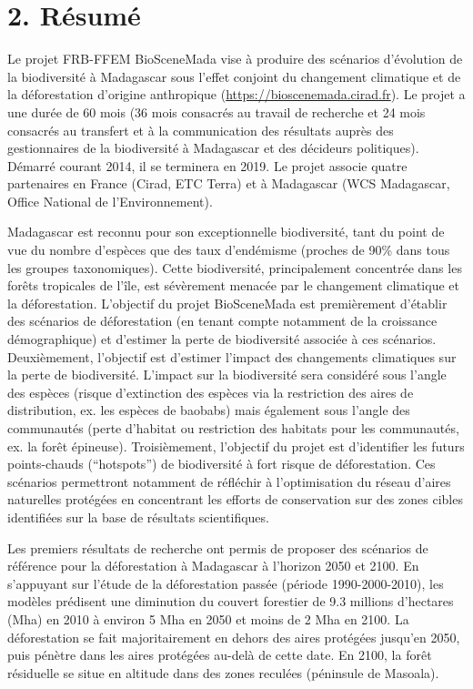 \documentclass[12pt,]{article}
\begin{document}
\hypertarget{resume}{%
\section{2. Résumé}\label{resume}}

Le projet FRB-FFEM BioSceneMada vise à produire des scénarios
d'évolution de la biodiversité à Madagascar sous l'effet conjoint du
changement climatique et de la déforestation d'origine anthropique
(\url{https://bioscenemada.cirad.fr}). Le projet a une durée de 60 mois
(36 mois consacrés au travail de recherche et 24 mois consacrés au
transfert et à la communication des résultats auprès des gestionnaires
de la biodiversité à Madagascar et des décideurs politiques). Démarré
courant 2014, il se terminera en 2019. Le projet associe quatre
partenaires en France (Cirad, ETC Terra) et à Madagascar (WCS
Madagascar, Office National de l'Environnement).

Madagascar est reconnu pour son exceptionnelle biodiversité, tant du
point de vue du nombre d'espèces que des taux d'endémisme (proches de
90\% dans tous les groupes taxonomiques). Cette biodiversité,
principalement concentrée dans les forêts tropicales de l'île, est
sévèrement menacée par le changement climatique et la déforestation.
L'objectif du projet BioSceneMada est premièrement d'établir des
scénarios de déforestation (en tenant compte notamment de la croissance
démographique) et d'estimer la perte de biodiversité associée à ces
scénarios. Deuxièmement, l'objectif est d'estimer l'impact des
changements climatiques sur la perte de biodiversité. L'impact sur la
biodiversité sera considéré sous l'angle des espèces (risque
d'extinction des espèces via la restriction des aires de distribution,
ex. les espèces de baobabs) mais également sous l'angle des communautés
(perte d'habitat ou restriction des habitats pour les communautés, ex.
la forêt épineuse). Troisièmement, l'objectif du projet est d'identifier
les futurs points-chauds (``hotspots'') de biodiversité à fort risque de
déforestation. Ces scénarios permettront notamment de réfléchir à
l'optimisation du réseau d'aires naturelles protégées en concentrant les
efforts de conservation sur des zones cibles identifiées sur la base de
résultats scientifiques.

Les premiers résultats de recherche ont permis de proposer des scénarios
de référence pour la déforestation à Madagascar à l'horizon 2050 et
2100. En s'appuyant sur l'étude de la déforestation passée (période
1990-2000-2010), les modèles prédisent une diminution du couvert
forestier de 9.3 millions d'hectares (Mha) en 2010 à environ 5 Mha en
2050 et moins de 2 Mha en 2100. La déforestation se fait majoritairement
en dehors des aires protégées jusqu'en 2050, puis pénètre dans les aires
protégées au-delà de cette date. En 2100, la forêt résiduelle se situe
en altitude dans des zones reculées (péninsule de Masoala).
\end{document}
